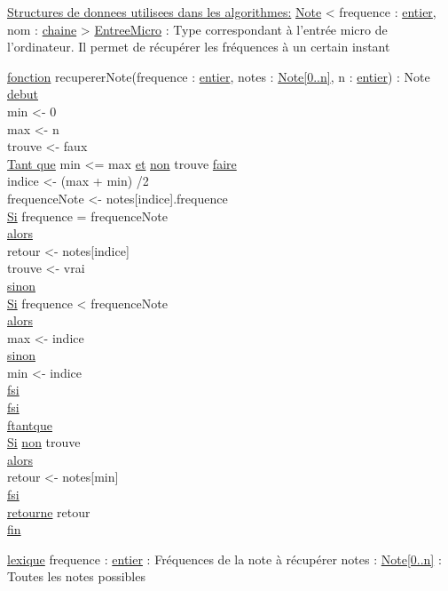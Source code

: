 \ul{Structures de donnees utilisees dans les algorithmes:}\newline
\ul{Note} < frequence : \ul{entier}, nom : \ul{chaine} >\newline
\ul{EntreeMicro} : Type correspondant à l'entrée micro de l'ordinateur. Il permet de récupérer les fréquences à un certain instant\newline
\begin{tabbing}
\ul{fonction} recupererNote(frequence : \ul{entier}, notes : \ul{Note[0..n]}, n : \ul{entier}) : Note\\
\ul{debut}\\
min <- 0\\
max <- n\\
trouve <- faux\\
\ul{Tant que} min <= max \ul{et} \ul{non} trouve \ul{faire}\\
    indice <- (max + min) /2 \\
    frequenceNote <- notes[indice].frequence\\
    \ul{Si} frequence = frequenceNote\\
    \ul{alors}\\
        retour <- notes[indice]\\
        trouve <- vrai\\
    \ul{sinon}\\
        \ul{Si} frequence < frequenceNote\\
        \ul{alors}\\
            max <- indice\\
        \ul{sinon}\\
            min <- indice\\
        \ul{fsi}\\
    \ul{fsi}\\
\ul{ftantque}\\
\ul{Si} \ul{non} trouve\\
\ul{alors}\\
    retour <- notes[min]\\
\ul{fsi}\\
\ul{retourne} retour\\
\ul{fin}\\
\end{tabbing}
\ul{lexique}\newline
frequence : \ul{entier} : Fréquences de la note à récupérer\newline
notes : \ul{Note[0..n]} : Toutes les notes possibles\newline
